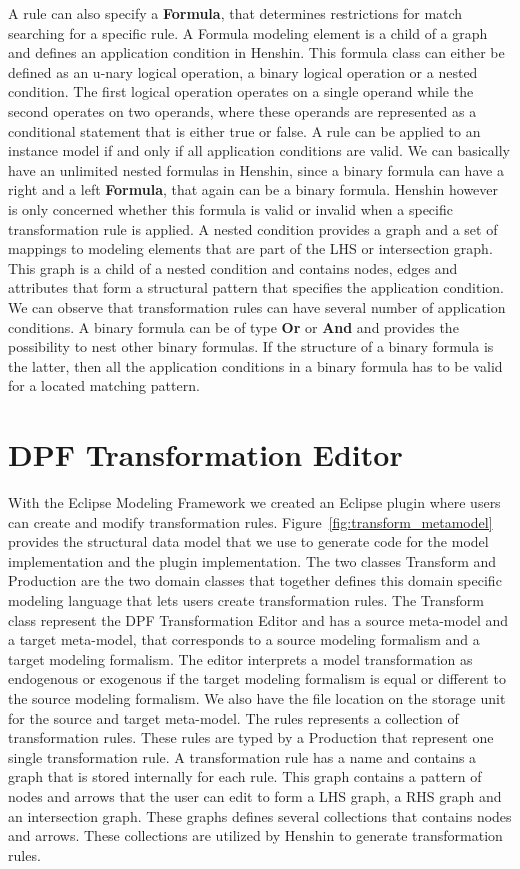 A rule can also specify a \textbf{Formula}, that determines restrictions for
match searching for a specific rule. A Formula modeling element is a child
of a graph and defines an application condition in Henshin. This formula class
can either be defined as an u-nary logical operation, a binary logical operation
or a nested condition. The first logical operation operates on a single operand
while the second operates on two operands, where these operands are represented
as a conditional statement that is either true or false. A rule can be applied
to an instance model if and only if all application conditions are valid. We
can basically have an unlimited nested formulas in Henshin, since a binary
formula can have a right and a left \textbf{Formula}, that again can be a
binary formula. Henshin however is only concerned whether this formula is valid
or invalid when a specific transformation rule is applied. A nested condition
provides a graph and a set of mappings to modeling elements that are part of
the LHS or intersection graph. This graph is a child of a nested condition and
contains nodes, edges and attributes that form a structural pattern that
specifies the application condition. We can observe that transformation rules
can have several number of application conditions. A binary formula can be of
type \textbf{Or} or \textbf{And} and provides the possibility to nest other
binary formulas. If the structure of a binary formula is the latter, then all
the application conditions in a binary formula has to be valid for a located
matching pattern.

\section{DPF Transformation Editor}

With the Eclipse Modeling Framework we created an Eclipse plugin where users can
create and modify transformation rules. Figure~\ref{fig:transform_metamodel}
provides the structural data model that we use to generate code for the model
implementation and the plugin implementation. The two classes Transform and
Production are the two domain classes that together defines this domain specific
modeling language that lets users create transformation rules. The Transform
class represent the DPF Transformation Editor and has a source meta-model and a
target meta-model, that corresponds to a source modeling formalism and a target
modeling formalism. The editor interprets a model transformation as endogenous
or exogenous if the target modeling formalism is equal or different to the
source modeling formalism. We also have the file location on the storage unit
for the source and target meta-model. The rules represents a collection of
transformation rules. These rules are typed by a Production that represent one
single transformation rule. A transformation rule has a name and contains a
graph that is stored internally for each rule.
This graph contains a pattern of nodes and arrows that the user can edit to
form a LHS graph, a RHS graph and an intersection graph. These graphs defines
several collections that contains nodes and arrows. These collections are
utilized by Henshin to generate transformation rules.

